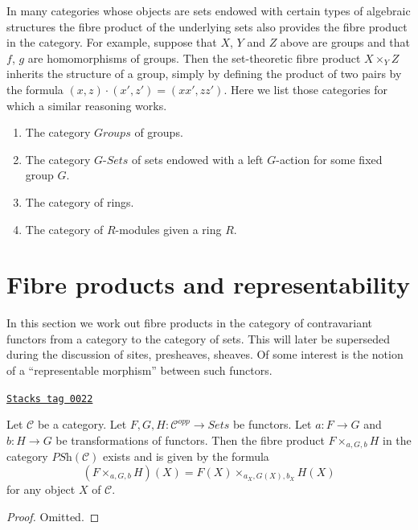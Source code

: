 \medskip\noindent
In many categories whose objects are sets endowed with certain types of
algebraic structures the fibre product of the underlying sets also
provides the fibre product in the category. For example, suppose
that $X$, $Y$ and $Z$ above are groups and that $f$, $g$ are
homomorphisms of groups. Then the set-theoretic fibre product
$X \times_Y Z$ inherits the structure of a group, simply by
defining the product of two pairs by the formula
$(x, z) \cdot (x', z') = (xx', zz')$. Here we list those categories
for which a similar reasoning works.
\begin{enumerate}
\item The category $\textit{Groups}$ of groups.
\item The category $G\textit{-Sets}$ of sets
endowed with a left $G$-action for some fixed group $G$.
\item The category of rings.
\item The category of $R$-modules given a ring $R$.
\end{enumerate}

\section{Fibre products and representability}
\label{categories-section-representable-map-presheaves}
In this section we work out fibre products in the
category of contravariant functors from a category
to the category of sets. This will later be superseded
during the discussion of sites, presheaves, sheaves. Of some
interest is the notion of a ``representable morphism'' between
such functors.

\begin{lemma}
\label{categories-lemma-fibre-product-presheaves}
\href{https://stacks.math.columbia.edu/tag/0022}{\texttt{Stacks tag 0022}}

Let $\mathcal{C}$ be a category.
Let $F, G, H : \mathcal{C}^{opp} \to \textit{Sets}$
be functors. Let $a : F \to G$ and $b : H \to G$ be
transformations of functors. Then the fibre product
$F \times_{a, G, b} H$ in the category
$\textit{PSh}(\mathcal{C})$
exists and is given by the formula
$$
(F \times_{a, G, b} H)(X) =
F(X) \times_{a_X, G(X), b_X} H(X)
$$
for any object $X$ of $\mathcal{C}$.
\end{lemma}

\begin{proof}
Omitted.
\end{proof}

